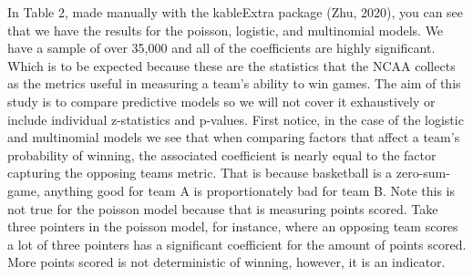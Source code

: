 \documentclass[
  man,floatsintext]{apa6}
\begin{document}
In Table 2, made manually with the kableExtra package (Zhu, 2020), you can see that we have the results for the poisson, logistic, and multinomial models. We have a sample of over 35,000 and all of the coefficients are highly significant. Which is to be expected because these are the statistics that the NCAA collects as the metrics useful in measuring a team's ability to win games. The aim of this study is to compare predictive models so we will not cover it exhaustively or include individual z-statistics and p-values. First notice, in the case of the logistic and multinomial models we see that when comparing factors that affect a team's probability of winning, the associated coefficient is nearly equal to the factor capturing the opposing teams metric. That is because basketball is a zero-sum-game, anything good for team A is proportionately bad for team B. Note this is not true for the poisson model because that is measuring points scored. Take three pointers in the poisson model, for instance, where an opposing team scores a lot of three pointers has a significant coefficient for the amount of points scored. More points scored is not deterministic of winning, however, it is an indicator.
\end{document}
